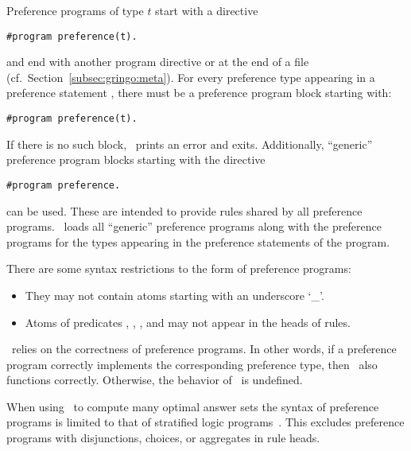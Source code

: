 \begin{note}
Preference programs of type $t$ start with a directive
\begin{lstlisting}[numbers=none]
#program preference(t).
\end{lstlisting}
and end with another program directive or at the end of a file
(cf.~Section~\ref{subsec:gringo:meta}).
For every preference type  appearing in a preference statement , 
there must be a preference program block starting with:
\begin{lstlisting}[numbers=none]
#program preference(t).
\end{lstlisting}
If there is no such block, \asprin\ prints an error and exits.
Additionally, ``generic'' preference program blocks starting with the directive
\begin{lstlisting}[numbers=none]
#program preference.
\end{lstlisting}
can be used. 
These are intended to provide rules shared by all preference programs.
\asprin\ loads all ``generic'' preference programs along with 
the preference programs for the types appearing in the preference statements of the program.
\end{note}

\begin{note}
There are some syntax restrictions to the form of preference programs:
\begin{itemize}
\item They may not contain atoms starting with an underscore `\_'.
\item Atoms of predicates , , 
      ,  and 
      may not appear in the heads of rules.
\end{itemize}
\end{note}

\begin{note}
\asprin\ relies on the correctness of preference programs. 
In other words, 
if a preference program correctly implements the corresponding preference type,
then \asprin\ also functions correctly.
Otherwise, the behavior of \asprin\ is undefined.
\end{note}

\begin{note}
When using \asprin\ to compute many optimal answer sets the syntax of preference programs
is limited to that of stratified logic programs~\cite{apblwa87a}.
This excludes preference programs with disjunctions, choices, or aggregates in rule heads.
\end{note}

